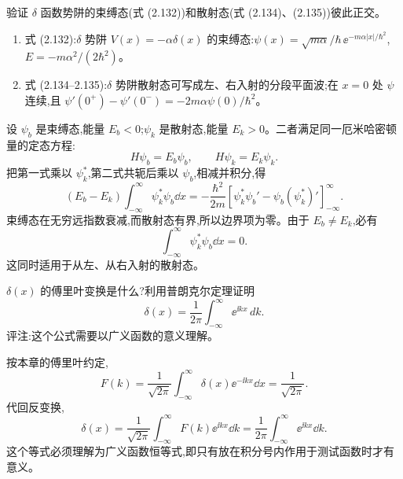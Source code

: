 \begin{question}
验证 $\delta$ 函数势阱的束缚态(式 (2.132))和散射态(式 (2.134)、(2.135))彼此正交。

\par\smallskip
{}
\begin{enumerate}[leftmargin=2.2em,itemsep=0.12em,topsep=0.12em,parsep=0pt]
\item 式 (2.132):$\delta$ 势阱 $V(x)=-\alpha\delta(x)$ 的束缚态:$\psi(x)=\sqrt{m\alpha}/\hbar\,\ee^{-m\alpha|x|/\hbar^2}$,$E=-m\alpha^2/(2\hbar^2)$。
\item 式 (2.134--2.135):$\delta$ 势阱散射态可写成左、右入射的分段平面波;在 $x=0$ 处 $\psi$ 连续,且 $\psi'(0^+)-\psi'(0^-)=-2m\alpha\psi(0)/\hbar^2$。
\end{enumerate}

\end{question}
\begin{solution}
设 $\psi_b$ 是束缚态,能量 $E_b<0$;$\psi_k$ 是散射态,能量 $E_k>0$。二者满足同一厄米哈密顿量的定态方程:
\[
H\psi_b=E_b\psi_b,
\qquad
H\psi_k=E_k\psi_k.
\]
把第一式乘以 $\psi_k^*$,第二式共轭后乘以 $\psi_b$,相减并积分,得
\[
(E_b-E_k)\int_{-\infty}^{\infty}\psi_k^*\psi_b\dd x
=-\frac{\hbar^2}{2m}\left[\psi_k^*\psi_b'-\psi_b(\psi_k^*)'\right]_{-\infty}^{\infty}.
\]
束缚态在无穷远指数衰减,而散射态有界,所以边界项为零。由于 $E_b\ne E_k$,必有
\[
\int_{-\infty}^{\infty}\psi_k^*\psi_b\dd x=0.
\]
这同时适用于从左、从右入射的散射态。
\end{solution}

\begin{question}
$\delta(x)$ 的傅里叶变换是什么?利用普朗克尔定理证明
\[
\delta(x)=\frac{1}{2\pi}\int_{-\infty}^{\infty}\ee^{\ii kx}\,dk .
\]
评注:这个公式需要以广义函数的意义理解。
\end{question}
\begin{solution}
按本章的傅里叶约定,
\[
F(k)=\frac1{\sqrt{2\pi}}\int_{-\infty}^{\infty}\delta(x)\ee^{-\ii kx}\dd x
=\frac1{\sqrt{2\pi}}.
\]
代回反变换,
\[
\delta(x)=\frac1{\sqrt{2\pi}}\int_{-\infty}^{\infty}F(k)\ee^{\ii kx}\dd k
=\frac1{2\pi}\int_{-\infty}^{\infty}\ee^{\ii kx}\dd k.
\]
这个等式必须理解为广义函数恒等式,即只有放在积分号内作用于测试函数时才有意义。
\end{solution}

